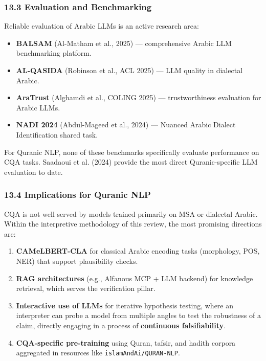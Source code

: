 \documentclass[12pt,a4paper]{article}
\providecommand{\tightlist}{\setlength{\itemsep}{0pt}\setlength{\parskip}{0pt}}
\begin{document}
\subsubsection{13.3 Evaluation and Benchmarking}\label{s13-3}

Reliable evaluation of Arabic LLMs is an active research area:

\begin{itemize}
\tightlist
\item
  \textbf{BALSAM} (Al-Matham et al., 2025) --- comprehensive Arabic LLM
  benchmarking platform.
\item
  \textbf{AL-QASIDA} (Robinson et al., ACL 2025) --- LLM quality in
  dialectal Arabic.
\item
  \textbf{AraTrust} (Alghamdi et al., COLING 2025) --- trustworthiness
  evaluation for Arabic LLMs.
\item
  \textbf{NADI 2024} (Abdul-Mageed et al., 2024) --- Nuanced Arabic
  Dialect Identification shared task.
\end{itemize}

For Quranic NLP, none of these benchmarks specifically evaluate
performance on CQA tasks. Saadaoui et al. (2024) provide the most direct
Quranic-specific LLM evaluation to date.

\subsubsection{13.4 Implications for Quranic NLP}\label{s13-4}

CQA is not well served by models trained primarily on MSA or dialectal
Arabic. Within the interpretive methodology of this review, the most
promising directions are:

\begin{enumerate}
\tightlist
\item
  \textbf{CAMeLBERT-CLA} for classical Arabic encoding tasks
  (morphology, POS, NER) that support plausibility checks.
\item
  \textbf{RAG architectures} (e.g., Alfanous MCP + LLM backend) for
  knowledge retrieval, which serves the verification pillar.
\item
  \textbf{Interactive use of LLMs} for iterative hypothesis testing,
  where an interpreter can probe a model from multiple angles to test
  the robustness of a claim, directly engaging in a process of
  \textbf{continuous falsifiability}.
\item
  \textbf{CQA-specific pre-training} using Quran, tafsir, and hadith
  corpora aggregated in resources like \texttt{islamAndAi/QURAN-NLP}.
\end{enumerate}
\end{document}

